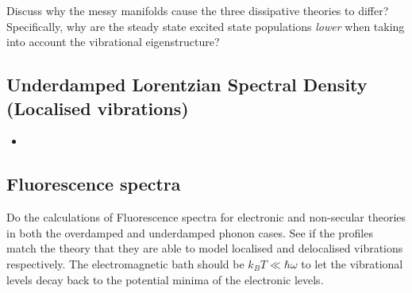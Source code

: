 \documentclass[]{article}
\begin{document}
Discuss why the messy manifolds cause the three dissipative theories to differ? Specifically, why are the steady state excited state populations \textit{lower} when taking into account the vibrational eigenstructure?

\subsection{Underdamped Lorentzian Spectral Density (Localised vibrations)}
\begin{itemize}
	\item 
\end{itemize}
\begin{figure}
	
\end{figure}

\subsection{Fluorescence spectra}
Do the calculations of Fluorescence spectra for electronic and non-secular theories in both the overdamped and underdamped phonon cases. See if the profiles match the theory that they are able to model localised and delocalised vibrations respectively. The electromagnetic bath should be $k_B T\ll \hbar\omega$ to let the vibrational levels decay back to the potential minima of the electronic levels.
\end{document}
